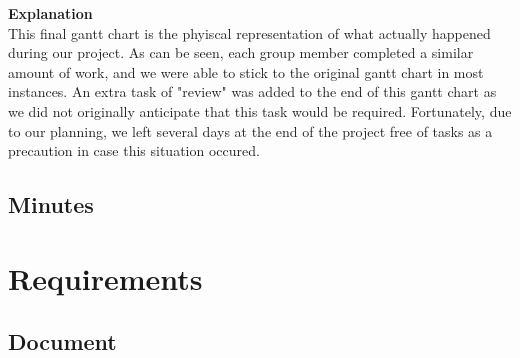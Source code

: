 \documentclass[a4paper]{article}
\begin{document}
\begin{landscape}
\textbf{Explanation} \\
This final gantt chart is the phyiscal representation of what actually happened during our project. As can be seen, each group member completed a similar amount of work, and we were able to stick to the original gantt chart in most instances. An extra task of "review" was added to the end of this gantt chart as we did not originally anticipate that this task would be required. Fortunately, due to our planning, we left several days at the end of the project free of tasks as a precaution in case this situation occured.

\end{landscape}

\subsection{Minutes} %

\section{Requirements}

\subsection{Document} %
\end{document}
